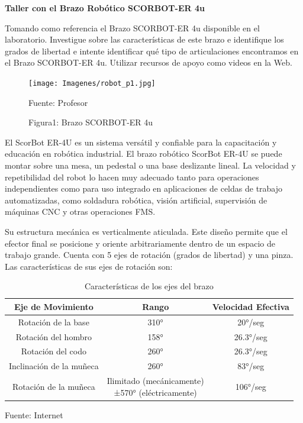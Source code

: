 \textbf{Taller con el Brazo Robótico SCORBOT-ER 4u}

Tomando como referencia el Brazo SCORBOT-ER 4u disponible en el laboratorio. Investigue sobre las características de este brazo e identifique los grados de libertad e intente identificar qué tipo de articulaciones encontramos en el Brazo SCORBOT-ER 4u. Utilizar recursos de apoyo como videos en la Web. 

\begin{figure}[H]
    \centering
    \texttt{[image: Imagenes/robot\_p1.jpg]}
    \caption{Figura1: Brazo SCORBOT-ER 4u }{Fuente: Profesor}
\end{figure}

El ScorBot ER-4U es un sistema versátil y confiable para la capacitación y educación en robótica industrial. El brazo robótico ScorBot ER-4U se puede montar sobre una mesa, un pedestal o una base deslizante lineal. La velocidad y repetibilidad del robot lo hacen muy adecuado tanto para operaciones independientes como para uso integrado en aplicaciones de celdas de trabajo automatizadas, como soldadura robótica, visión artificial, supervisión de máquinas CNC y otras operaciones FMS.

Su estructura mecánica es verticalmente aticulada. Este diseño permite que el efector final se posicione y oriente arbitrariamente dentro de un espacio de trabajo grande. Cuenta con 5 ejes de rotación (grados de libertad) y una pinza. Las características de sus ejes de rotación son:

\begin{table}[H]
    \centering
    \begin{tabular}{|c|c|c|}
        \hline
        Eje de Movimiento & Rango & Velocidad Efectiva \\
        \hline
        Rotación de la base & 310° & 20°/seg \\ 
        \hline
        Rotación del hombro & 158° & 26.3°/seg \\
        \hline
        Rotación del codo & 260° & 26.3°/seg \\
        \hline
        Inclinación de la muñeca & 260° & 83°/seg \\
        \hline
        Rotación de la muñeca & \parbox[c]{6cm}{Ilimitado (mecánicamente)\\±570° (eléctricamente)} & 106°/seg\\
        \hline
    \end{tabular}
    \caption{Características de los ejes del brazo}{Fuente: Internet}
\end{table}

